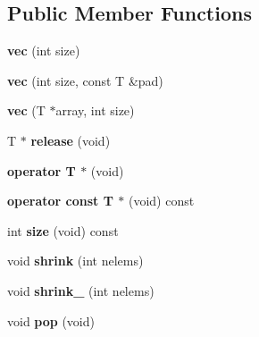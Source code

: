 \subsection*{\-Public \-Member \-Functions}
\begin{DoxyCompactItemize}
\item 
\hypertarget{classvec_ad2d8eaf011ab18c61f19b50fdb3245a5}{{\bfseries vec} (int size)}\label{classvec_ad2d8eaf011ab18c61f19b50fdb3245a5}

\item 
\hypertarget{classvec_a32b79f3a6825ce05df3cccbbb1faa9b4}{{\bfseries vec} (int size, const \-T \&pad)}\label{classvec_a32b79f3a6825ce05df3cccbbb1faa9b4}

\item 
\hypertarget{classvec_ae2d0a0165045abc5413118e7a2a09ee7}{{\bfseries vec} (\-T $\ast$array, int size)}\label{classvec_ae2d0a0165045abc5413118e7a2a09ee7}

\item 
\hypertarget{classvec_a0b831b8800ace996554564a5a723a59c}{\-T $\ast$ {\bfseries release} (void)}\label{classvec_a0b831b8800ace996554564a5a723a59c}

\item 
\hypertarget{classvec_aa7cf91320e0fde5674d6b6b952c83f89}{{\bfseries operator T $\ast$} (void)}\label{classvec_aa7cf91320e0fde5674d6b6b952c83f89}

\item 
\hypertarget{classvec_adaa00605cf8f791ecf18edae9106ef4c}{{\bfseries operator const T $\ast$} (void) const }\label{classvec_adaa00605cf8f791ecf18edae9106ef4c}

\item 
\hypertarget{classvec_ae30f1ee29be9f65f168a1d28087d64a3}{int {\bfseries size} (void) const }\label{classvec_ae30f1ee29be9f65f168a1d28087d64a3}

\item 
\hypertarget{classvec_a6b9e9337e115751be7aed3021baa13c2}{void {\bfseries shrink} (int nelems)}\label{classvec_a6b9e9337e115751be7aed3021baa13c2}

\item 
\hypertarget{classvec_a7668361dcdf7de8eb1bf5e015da7f94b}{void {\bfseries shrink\-\_\-} (int nelems)}\label{classvec_a7668361dcdf7de8eb1bf5e015da7f94b}

\item 
\hypertarget{classvec_a6a042abff22c6b3eb3f3a552212daf5f}{void {\bfseries pop} (void)}\label{classvec_a6a042abff22c6b3eb3f3a552212daf5f}


\end{DoxyCompactItemize}
